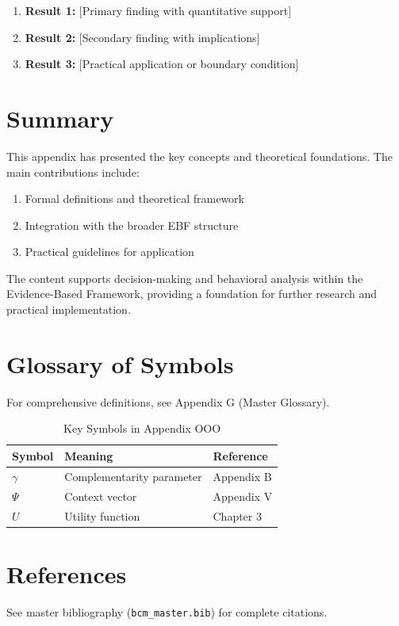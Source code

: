 \begin{enumerate}
    \item \textbf{Result 1:} [Primary finding with quantitative support]
    \item \textbf{Result 2:} [Secondary finding with implications]
    \item \textbf{Result 3:} [Practical application or boundary condition]
\end{enumerate}


\section{Summary}
\label{sec:ooo-summary}

This appendix has presented the key concepts and theoretical foundations.
The main contributions include:

\begin{enumerate}
    \item Formal definitions and theoretical framework
    \item Integration with the broader EBF structure
    \item Practical guidelines for application
\end{enumerate}

The content supports decision-making and behavioral analysis within the
Evidence-Based Framework, providing a foundation for further research
and practical implementation.


\section{Glossary of Symbols}
\label{sec:ooo-glossary}

For comprehensive definitions, see Appendix G (Master Glossary).

\begin{table}[htbp]
\centering
\caption{Key Symbols in Appendix OOO}
\begin{tabular}{lll}
\toprule
\textbf{Symbol} & \textbf{Meaning} & \textbf{Reference} \\
\midrule
$\gamma$ & Complementarity parameter & Appendix B \\
$\Psi$ & Context vector & Appendix V \\
$U$ & Utility function & Chapter 3 \\
\bottomrule
\end{tabular}
\end{table}


\section{References}
\label{sec:references}

See master bibliography (\texttt{bcm\_master.bib}) for complete citations.

\nocite{bcm_master}


